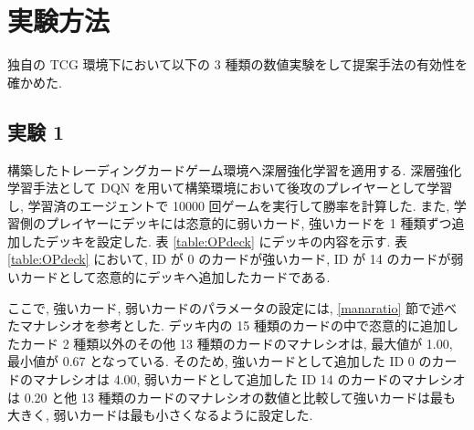 \documentclass[12pt]{jarticle}
\begin{document}
\clearpage
\section{実験方法}
独自の TCG 環境下において以下の 3 種類の数値実験をして提案手法の有効性を確かめた.
\subsection{実験 1}
構築したトレーディングカードゲーム環境へ深層強化学習を適用する. 
深層強化学習手法として DQN を用いて構築環境において後攻のプレイヤーとして学習し, 学習済のエージェントで 10000 回ゲームを実行して勝率を計算した. また, 学習側のプレイヤーにデッキには恣意的に弱いカード, 強いカードを 1 種類ずつ追加したデッキを設定した.
表 \ref{table:OPdeck} にデッキの内容を示す. 表 \ref{table:OPdeck} において, ID が 0 のカードが強いカード, ID が 14 のカードが弱いカードとして恣意的にデッキへ追加したカードである.\par
ここで, 強いカード, 弱いカードのパラメータの設定には, \ref{manaratio} 節で述べたマナレシオを参考とした. デッキ内の 15 種類のカードの中で恣意的に追加したカード 2 種類以外のその他 13 種類のカードのマナレシオは, 最大値が 1.00, 最小値が 0.67 となっている. そのため, 強いカードとして追加した ID 0 のカードのマナレシオは 4.00, 弱いカードとして追加した ID 14 のカードのマナレシオは 0.20 と他 13 種類のカードのマナレシオの数値と比較して強いカードは最も大きく, 弱いカードは最も小さくなるように設定した.
\end{document}
